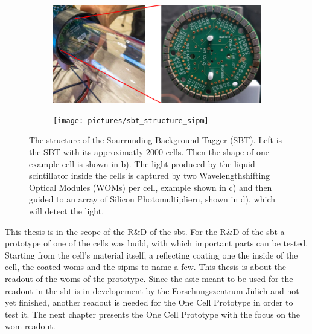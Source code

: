 \begin{figure}
\begin{subfigure}[b]{0.25\textwidth}
	\end{subfigure}
	\begin{subfigure}[b]{0.25\textwidth}
		\centering
		\includegraphics[width=.9\textwidth]{pictures/sbt_structure_wom}
		\label{fig:sbt_structure}
	\end{subfigure}
	\begin{subfigure}[b]{0.25\textwidth}
		\centering
		\texttt{[image: pictures/sbt\_structure\_sipm]}
		\label{fig:sbt_structure}
	\end{subfigure}
	\caption[Overview of the Sourrunding Background Tagger]{The structure of the Sourrunding Background Tagger (SBT). Left is the SBT with its approximatly 2000 cells. Then the shape of one example cell is shown in b). The light produced by the liquid scintillator inside the cells is captured by two Wavelengthshifting Optical Modules (WOMs) per cell, example shown in c) and then guided to an array of Silicon Photomultipliern, shown in d), which will detect the light.}
	\label{fig:sbt}
\end{figure}

This thesis is in the scope of the R\&D of the \ac{sbt}.
For the R\&D of the \ac{sbt} a prototype of one of the cells was build, with which important parts can be tested.
Starting from the cell's material itself, a reflecting coating one the inside of the cell, the coated \acp{wom} and the \acp{sipm} to name a few.
This thesis is about the readout of the \acp{wom} of the prototype.
Since the \ac{asic} meant to be used for the readout in the \ac{sbt} is in developement by the Forschungszentrum Jülich and not yet finished, another readout is needed for the One Cell Prototype in order to test it.
The next chapter presents the One Cell Prototype with the focus on the \ac{wom} readout.
